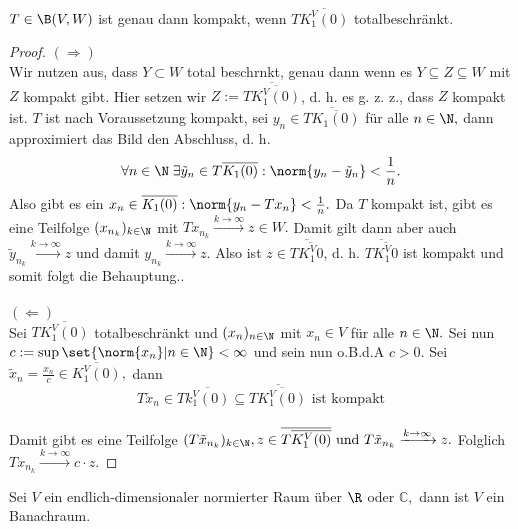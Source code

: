 \begin{theorem} \label{kmp_gdw_tot} $T \in \B(V, W)$ ist genau dann kompakt, wenn $T\overline{K_1^V(0)}$ totalbeschränkt. 
	
	
	\begin{proof} $(\Rightarrow)$ \\
		Wir nutzen aus, dass  \(Y\subset W\) total beschr\as nkt, genau dann wenn es \(Y\subseteq Z\subseteq W\) mit $Z$ kompakt gibt. Hier setzen wir \(Z := \overline{T\overline{K_1^V(0)}}\), d. h. es g. z. z., dass $Z$ kompakt ist. $T$ ist nach Voraussetzung kompakt, sei $y_n \in \overline{T\overline{K_1(0)}}$ für alle $n \in \N,$ dann approximiert das Bild den Abschluss, d. h. \[\forall n\in \N \;\exists \tilde y_n \in T\overline{K_1(0)}: \norm{y_n - \tilde y_n} < \frac{1}{n}.\] Also gibt es ein $x_n \in \overline{K_1(0)}: \norm{y_n -Tx_n} < \frac{1}{n}.$ Da $T$ kompakt ist, gibt es eine Teilfolge $(x_{n_k})_{k \in \N}$ mit $Tx_{n_k} \xrightarrow{k \to \infty} z\in W.$ Damit gilt dann aber auch $\tilde y_{n_k} \xrightarrow{k \to \infty} z$ und damit $y_{n_k} \xrightarrow{k \to \infty} z.$ Also ist $z \in \overline{T\overline{K^V_1{0}}}$, d. h. $\overline{T\overline{K^V_1{0}}}$ ist kompakt und somit folgt die Behauptung.. \\ \\
		$(\Leftarrow)$ \\
		Sei $T\overline{K_1^V(0)}$ totalbeschränkt und $(x_n)_{n \in \N}$ mit $x_n \in V $ für alle $n \in \N.$ Sei nun $c := \sup{\set{\norm{x_n}| n \in \N}} < \infty$ und sein nun o.B.d.A $c > 0.$ Sei $\tilde x_n = \frac{x_n}{c} \in \overline{K_1^V(0)},$ dann \[T\tilde x_n \in T\overline{k_1^V(0)} \subseteq \overline{T\overline{K_1^V(0)}} \text{ ist kompakt}\] \\
		Damit gibt es eine Teilfolge $(T \tilde x_{n_k})_{k \in \N}, z \in \overline{T\overline{K_1^V(0)}} \text{ und } T\tilde x_{n_k} \xrightarrow{k \to \infty} z.$ Folglich $Tx_{n_k} \xrightarrow{k \to \infty} c \cdot z.$
		
	\end{proof}
	
\end{theorem}


\begin{rem} Sei $V$ ein endlich-dimensionaler normierter Raum über $\R$ oder $\mathbb{C},$ dann ist $V$ ein Banachraum. 
	
\end{rem}


